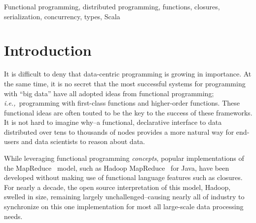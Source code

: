 \documentclass[10pt]{sigplanconf}
\theoremstyle{definition}
\theoremstyle{definition}
\newcommand{\ie}{{\em i.e.,~}}
\begin{document}
\begin{abstract}

\end{abstract}



\keywords
Functional programming, distributed programming, functions, closures,
serialization, concurrency, types, Scala

\section{Introduction}

It is difficult to deny that data-centric programming is growing in importance.
At the same time, it is no secret that the most successful systems for
programming with ``big data'' have all adopted ideas from functional
programming; \ie programming with first-class functions and higher-order
functions. These functional ideas are often touted to be the key to the success
of these frameworks. It is not hard to imagine why--a functional, declarative
interface to data distributed over tens to thousands of nodes provides a more
natural way for end-users and data scientists to reason about data.

While leveraging functional programming {\em concepts}, popular implementations
of the MapReduce~\cite{MapReduce} model, such as Hadoop MapReduce~\cite{Hadoop}
for Java, have been developed without making use of functional language features
such as closures. For nearly a decade, the open source interpretation of this
model, Hadoop, swelled in size, remaining largely unchallenged--causing nearly
all of industry to synchronize on this one implementation for most all
large-scale data processing needs.
\end{document}

